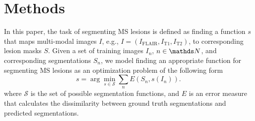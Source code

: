 \section{Methods}
\label{sec:method}

In this paper, the task of segmenting MS lesions is defined as finding a
function $s$ that maps multi-modal images $I$, e.g., $I = (I_\text{FLAIR},
I_\text{T1}, I_\text{T2})$, to corresponding lesion masks $S$. Given a set of
training images $I_n$, $n \in \N$, and corresponding segmentations $S_n$, we
model finding an appropriate function for segmenting MS lesions as an
optimization problem of the following form
\begin{equation}
\hat{s} = \arg \min_{s \in \mathcal{S}} \sum_n E(S_n, s(I_n)).
\label{eq:segprob}
\end{equation}
where $\mathcal{S}$ is the set of possible segmentation functions, and $E$ is an
error measure that calculates the dissimilarity between ground truth
segmentations and predicted segmentations.


% 
% 
% 

